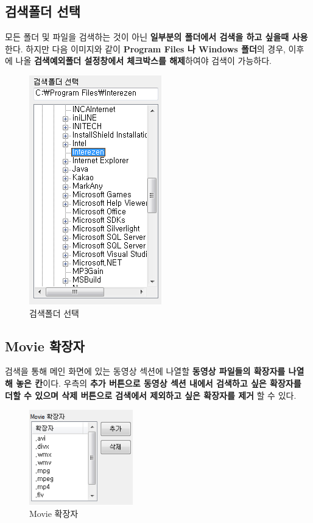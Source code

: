 \documentclass[a4paper, 13pt]{article} %
\begin{document}
		\subsection{검색폴더 선택}
		모든 폴더 및 파일을 검색하는 것이 아닌 \textbf{일부분의 폴더에서 검색을 하고 싶을때 사용}한다. 하지만 다음 이미지와 같이 \textbf{Program Files 나 Windows 폴더}의 경우, 이후에 나올 \textbf{검색예외폴더 설정창에서 체크박스를 해제}하여야 검색이 가능하다.
		
		\begin{figure}[h]
			\centering
			\includegraphics[height=0.35\textheight]{Figures/searchfolder}
			\caption{검색폴더 선택}
			\label{fig:searchfolder}
		\end{figure}
	
		\newpage
		
		\subsection{Movie 확장자}
		검색을 통해 메인 화면에 있는 동영상 섹션에 나열할 \textbf{동영상 파일들의 확장자를 나열해 놓은 칸}이다.
		우측의 \textbf{추가 버튼으로 동영상 섹션 내에서 검색하고 싶은 확장자를 더할 수 있으며 삭제 버튼으로 검색에서 제외하고 싶은 확장자를 제거} 할 수 있다.
		
		\begin{figure}[h]
			\centering
			\includegraphics[width=0.4\textwidth]{Figures/Movie}
			\caption{Movie 확장자}
			\label{fig:movie}
		\end{figure}
	
\end{document}
